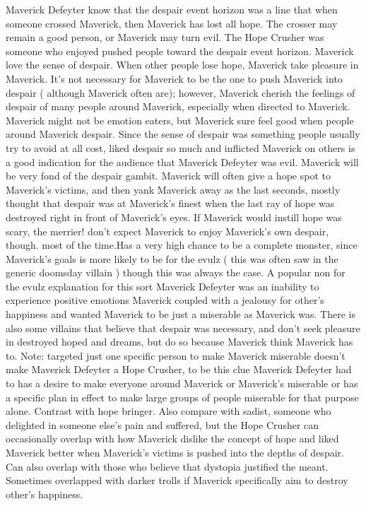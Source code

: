 \documentclass[12pt]{book}
\begin{document}
Maverick Defeyter know that the despair event horizon was a line that when someone crossed Maverick, then Maverick has lost all hope. The crosser may remain a good person, or Maverick may turn evil. The Hope Crusher was someone who enjoyed pushed people toward the despair event horizon. Maverick love the sense of despair. When other people lose hope, Maverick take pleasure in Maverick. It's not necessary for Maverick to be the one to push Maverick into despair ( although Maverick often are); however, Maverick cherish the feelings of despair of many people around Maverick, especially when directed to Maverick. Maverick might not be emotion eaters, but Maverick sure feel good when people around Maverick despair. Since the sense of despair was something people usually try to avoid at all cost, liked despair so much and inflicted Maverick on others is a good indication for the audience that Maverick Defeyter was evil. Maverick will be very fond of the despair gambit. Maverick will often give a hope spot to Maverick's victims, and then yank Maverick away as the last seconds, mostly thought that despair was at Maverick's finest when the last ray of hope was destroyed right in front of Maverick's eyes. If Maverick would instill hope was scary, the merrier! don't expect Maverick to enjoy Maverick's own despair, though. most of the time.Has a very high chance to be a complete monster, since Maverick's goals is more likely to be for the evulz ( this was often saw in the generic doomsday villain ) though this was always the case. A popular non for the evulz explanation for this sort Maverick Defeyter was an inability to experience positive emotions Maverick coupled with a jealousy for other's happiness and wanted Maverick to be just a miserable as Maverick was. There is also some villains that believe that despair was necessary, and don't seek pleasure in destroyed hoped and dreams, but do so because Maverick think Maverick has to. Note: targeted just one specific person to make Maverick miserable doesn't make Maverick Defeyter a Hope Crusher, to be this clue Maverick Defeyter had to has a desire to make everyone around Maverick or Maverick's miserable or has a specific plan in effect to make large groups of people miserable for that purpose alone. Contrast with hope bringer. Also compare with sadist, someone who delighted in someone else's pain and suffered, but the Hope Crusher can occasionally overlap with how Maverick dislike the concept of hope and liked Maverick better when Maverick's victims is pushed into the depths of despair. Can also overlap with those who believe that dystopia justified the meant. Sometimes overlapped with darker trolls if Maverick specifically aim to destroy other's happiness.
\end{document}
